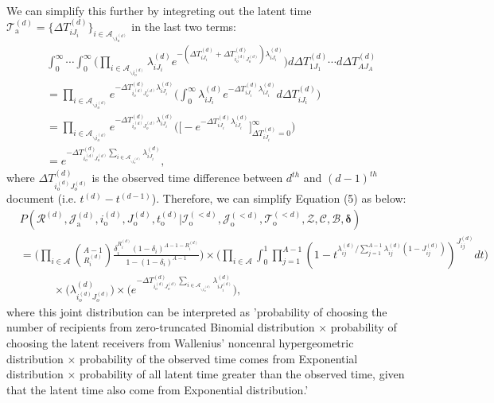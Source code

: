 \documentclass[a4paper]{article}
\begin{document}
\\ \newline
We can simplify this further by integreting out the latent time $\mathcal{T}^{(d)}_{\mbox{a}}=\{\Delta T^{(d)}_{iJ_i}\}_{i \in \mathcal{A}_{\backslash i_o^{(d)}}}$ in the last two terms:
\begin{equation}
\begin{aligned}
&\int_{0}^\infty\cdots\int_{0}^\infty \Big(\prod_{i\in \mathcal{A}_{\backslash i_o^{(d)}}} \lambda^{(d)}_{iJ_i}e^{-(\Delta T^{(d)}_{iJ_i} + \Delta T^{(d)}_{i_o^{(d)}J_o^{(d)}})\lambda^{(d)}_{iJ_i}} \Big)d\Delta T^{(d)}_{1J_1}\cdots d\Delta T^{(d)}_{AJ_A}\\&
= \prod_{i\in \mathcal{A}_{\backslash i_o^{(d)}}} e^{- \Delta T^{(d)}_{i_o^{(d)}J_o^{(d)}}\lambda^{(d)}_{iJ_i}} \Big(\int_{0}^\infty \lambda^{(d)}_{iJ_i}e^{-\Delta T^{(d)}_{iJ_i} \lambda^{(d)}_{iJ_i}}  d\Delta T^{(d)}_{iJ_i}\Big)
\\& =\prod_{i\in \mathcal{A}_{\backslash i_o^{(d)}}} e^{- \Delta T^{(d)}_{i_o^{(d)}J_o^{(d)}}\lambda^{(d)}_{iJ_i}} \Big(\Big [ - e^{-\Delta T^{(d)}_{iJ_i} \lambda^{(d)}_{iJ_i}}\Big]_{\Delta T^{(d)}_{iJ_i}  = 0} ^{\infty}\Big)
\\& = e^{- \Delta T^{(d)}_{i_o^{(d)}J_o^{(d)}}\sum_{i\in \mathcal{A}_{\backslash i_o^{(d)}}}\lambda^{(d)}_{iJ_i}},
\end{aligned}
\end{equation}
where $\Delta T^{(d)}_{i_o^{(d)}J_o^{(d)}}$ is the observed time difference between $d^{th}$ and $(d-1)^{th}$ document (i.e. $t^{(d)}-t^{(d-1)}$).
Therefore, we can simplify Equation (5) as below:
\begin{equation}
\begin{aligned}
&P(\mathcal{R}^{(d)},\mathcal{J}^{(d)}_{\mbox{a}}, i^{(d)}_{\mbox{o}}, J^{(d)}_{\mbox{o}}, t^{(d)}_{\mbox{o}} |\mathcal{I}^{(<d)}_{\mbox{o}}, \mathcal{J}^{(<d)}_{\mbox{o}}, \mathcal{T}^{(<d)}_{\mbox{o}}, \mathcal{Z}, \mathcal{C}, \mathcal{B}, \boldsymbol{\delta})\\&=\Big(\prod_{i\in \mathcal{A}} {{A-1}\choose R_i^{(d)}} \frac{\delta_i^{ R_i^{(d)}} (1-\delta_i)^{A-1-R_i^{(d)}}}{1 - (1-\delta_i)^{A-1}}\Big) \times \Big(\prod_{i\in \mathcal{A}}\int_0^1\prod_{j=1}^{A-1}(1-t^{\lambda_{ij}^{(d)} /  \sum_{j = 1}^{A-1} \lambda_{ij}^{(d)}(1-J_{ij}^{(d)})})^{J_{ij}^{(d)}}dt \Big)\\&\quad\quad\quad\times \Big(\lambda^{(d)}_{i_o^{(d)}J_{o}^{(d)}}\Big)\times  \Big(e^{-\Delta T^{(d)}_{i_o^{(d)}J_o^{(d)}}\sum\limits_{i\in \mathcal{A}_{\backslash i_o^{(d)}}}\lambda^{(d)}_{iJ^{(d)}_{i}}}\Big),
\end{aligned}
\end{equation}
where this joint distribution can be interpreted as 'probability of choosing the number of recipients from zero-truncated Binomial distribution $\times$ probability of choosing the latent receivers from Wallenius' noncenral hypergeometric distribution $\times$ probability of the observed time comes from Exponential distribution $\times$ probability of all latent time greater than the observed time, given that the latent time also come from Exponential distribution.'
\end{document}
